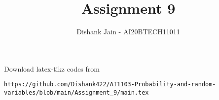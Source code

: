 \documentclass[journal,12pt,twocolumn]{IEEEtran}
\DeclareMathOperator*{\Res}{Res}
\begin{document}
\newcommand{\BEQA}{\begin{eqnarray}}
\newcommand{\EEQA}{\end{eqnarray}}
\newcommand{\define}{\stackrel{\triangle}{=}}

\raggedbottom
\setlength{\parindent}{0pt}
\providecommand{\mbf}{\mathbf}
\providecommand{\pr}[1]{\ensuremath{\Pr\left(#1\right)}}
\providecommand{\qfunc}[1]{\ensuremath{Q\left(#1\right)}}
\providecommand{\sbrak}[1]{\ensuremath{{}\left[#1\right]}}
\providecommand{\lsbrak}[1]{\ensuremath{{}\left[#1\right.}}
\providecommand{\rsbrak}[1]{\ensuremath{{}\left.#1\right]}}
\providecommand{\brak}[1]{\ensuremath{\left(#1\right)}}
\providecommand{\lbrak}[1]{\ensuremath{\left(#1\right.}}
\providecommand{\rbrak}[1]{\ensuremath{\left.#1\right)}}
\providecommand{\cbrak}[1]{\ensuremath{\left\{#1\right\}}}
\providecommand{\lcbrak}[1]{\ensuremath{\left\{#1\right.}}
\providecommand{\rcbrak}[1]{\ensuremath{\left.#1\right\}}}
\theoremstyle{remark}
\newtheorem{rem}{Remark}
\newcommand{\sgn}{\mathop{\mathrm{sgn}}}
\providecommand{\abs}[1]{\vert#1\vert}
\providecommand{\res}[1]{\Res\displaylimits_{#1}} 
\providecommand{\norm}[1]{\lVert#1\rVert}
\providecommand{\mtx}[1]{\mathbf{#1}}
\providecommand{\mean}[1]{E[ #1 ]}
\providecommand{\fourier}{\overset{\mathcal{F}}{ \rightleftharpoons}}
\providecommand{\system}{\overset{\mathcal{H}}{ \longleftrightarrow}}
\newcommand{\solution}{\noindent \textbf{Solution: }}
\newcommand{\cosec}{\,\text{cosec}\,}
\providecommand{\dec}[2]{\ensuremath{\overset{#1}{\underset{#2}{\gtrless}}}}
\newcommand{\myvec}[1]{\ensuremath{\begin{pmatrix}#1\end{pmatrix}}}
\newcommand{\mydet}[1]{\ensuremath{\begin{vmatrix}#1\end{vmatrix}}}
\makeatletter
{}
\makeatother
\let\StandardTheFigure\thefigure
\let\vec\mathbf
\renewcommand{\thefigure}{\theproblem}
\def\putbox#1#2#3{\makebox[0in][l]{\makebox[#1][l]{}\raisebox{\baselineskip}[0in][0in]{\raisebox{#2}[0in][0in]{#3}}}}
     \def\rightbox#1{\makebox[0in][r]{#1}}
     \def\centbox#1{\makebox[0in]{#1}}
     \def\topbox#1{\raisebox{-\baselineskip}[0in][0in]{#1}}
     \def\midbox#1{\raisebox{-0.5\baselineskip}[0in][0in]{#1}}
\vspace{3cm}
\title{Assignment 9}
\author{Dishank Jain - AI20BTECH11011}
\maketitle
\newpage
\bigskip
\renewcommand{\thefigure}{\theenumi}
\renewcommand{\thetable}{\theenumi}
Download latex-tikz codes from 
%
\begin{lstlisting}
https://github.com/Dishank422/AI1103-Probability-and-random-variables/blob/main/Assignment_9/main.tex
\end{lstlisting}
\end{document}

